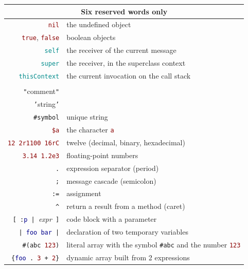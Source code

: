\documentclass[notumble]{leaflet}
\newcommand{\code}[1]{\foreignlanguage{english}{\texttt{#1}}}
\begin{document}
\noindent
\begin{tabularx}{\linewidth}{@{}rX@{}}
        \toprule
        \multicolumn{2}{c}{Six reserved words only}\\
        \midrule
        \textcolor{darkRed}{\code{nil}} & the undefined object\\
        \textcolor{darkRed}{\code{true}}, \textcolor{darkRed}{\code{false}} & boolean objects\\
        \textcolor{darkCyan}{\code{self}} & the receiver of the current message\\
        \textcolor{darkCyan}{\code{super}} & the receiver, in the superclass context\\
        \textcolor{darkCyan}{\code{thisContext}} & the current invocation on the call stack\\
        \addlinespace

        \toprule
        \multicolumn{2}{c}{Reserved punctuation characters}\\
        \midrule
        \textcolor{comment}{\code{"}{comment}\code{"}} & \\
        \textcolor{string}{\code{'}{string}\code{'}} & \\
        \textcolor{string}{\code{\#symbol}} & unique string \\
        \textcolor{darkRed}{\code{\$a}} & the character \textcolor{darkRed}{\code{a}} \\
        \textcolor{darkRed}{\code{12 2r1100 16rC}} & twelve (decimal, binary, hexadecimal)\\
        \textcolor{darkRed}{\code{3.14 1.2e3}} & floating-point numbers\\
        \code{.} & expression separator (period)\\
        \code{;} & message cascade (semicolon)\\
        \code{:=} & {assignment} \\
        \code{\textasciicircum} & return a result from a method (caret)\\
        \code{[\,:\textcolor{darkBlue}{p}\,|\,}\emph{expr}\code{\,]} & code block with a parameter \\
        \code{|\,\textcolor{darkBlue}{foo bar}\,|} & declaration of two temporary variables \\
        \code{\#(\textcolor{string}{abc} \textcolor{darkRed}{123})} & literal array with the symbol \textcolor{string}{\code{\#abc}} and the number \textcolor{darkRed}{\code{123}} \\
        \code{\{\textcolor{darkBlue}{foo}\,.\ \textcolor{darkRed}{3}\,+\,\textcolor{darkRed}{2}\}} & dynamic array built from 2 expressions\\
        \bottomrule
\end{tabularx}
\end{document}
